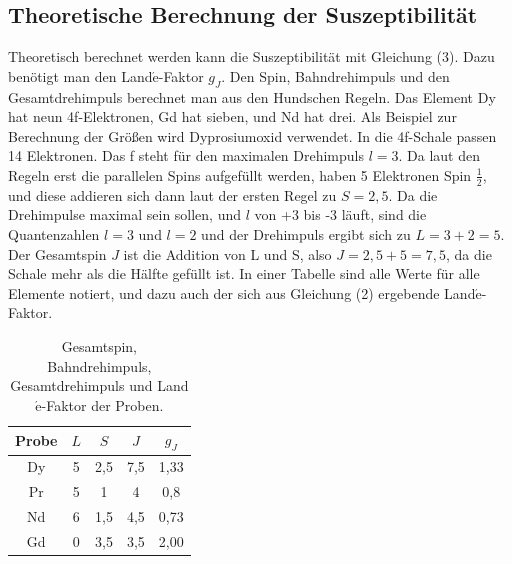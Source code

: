 \subsection{Theoretische Berechnung der Suszeptibilität}
Theoretisch berechnet werden kann die Suszeptibilität mit Gleichung (3). Dazu benötigt man den Land$\acute{\text{e}}$-Faktor $g_J$. Den Spin, Bahndrehimpuls und den Gesamtdrehimpuls berechnet man aus den Hundschen Regeln.
Das Element Dy hat neun 4f-Elektronen, Gd hat sieben, und Nd hat drei. Als Beispiel zur Berechnung der Größen wird Dyprosiumoxid verwendet.
In die 4f-Schale passen 14 Elektronen. Das f steht für den maximalen Drehimpuls $l = 3$. 
Da laut den Regeln erst die parallelen Spins aufgefüllt werden, haben 5 Elektronen Spin $\frac{1}{2}$,
und diese addieren sich dann laut der ersten Regel zu $S= 2,5$.
Da die Drehimpulse maximal sein sollen, und $l$ von +3 bis -3 läuft, sind die Quantenzahlen $l=3$ und $l=2$ und der Drehimpuls ergibt sich zu $L=3+2=5$.
Der Gesamtspin $J$ ist die Addition von L und S, also $J=2,5+5=7,5$, da die Schale mehr als die Hälfte gefüllt ist.
In einer Tabelle sind alle Werte für alle Elemente notiert, und dazu auch der sich aus Gleichung (2) ergebende Land$\acute{\text{e}}$-Faktor.
\begin{table}[H]
  \centering
  \caption{Gesamtspin, Bahndrehimpuls, Gesamtdrehimpuls und Land$\acute{\text{e}}$-Faktor der Proben.}
  \label{tab:Dy}
  \begin{tabular}{c c c c c}
    \toprule
    Probe & $L$ & $S$ & $J$  & $g_J$  \\
    \midrule
    Dy & 5 & 2,5 & 7,5 & 1,33\\
    Pr & 5 & 1 & 4 & 0,8 \\
    Nd & 6 & 1,5 & 4,5 & 0,73\\
    Gd & 0 & 3,5 & 3,5 & 2,00\\
    \bottomrule
  \end{tabular}
\end{table}

